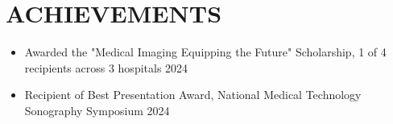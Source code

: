 
\section{\textcolor{airforceblue}{ACHIEVEMENTS}}
    \begin{itemize}[leftmargin=0.15in, itemsep=0pt, parsep=0pt]
        \item Awarded the "Medical Imaging Equipping the Future" Scholarship, 1 of 4 recipients across 3 hospitals \hfill 2024
        \item Recipient of Best Presentation Award, National Medical Technology Sonography Symposium \hfill 2024 
    \end{itemize}

\vspace{-12pt}
